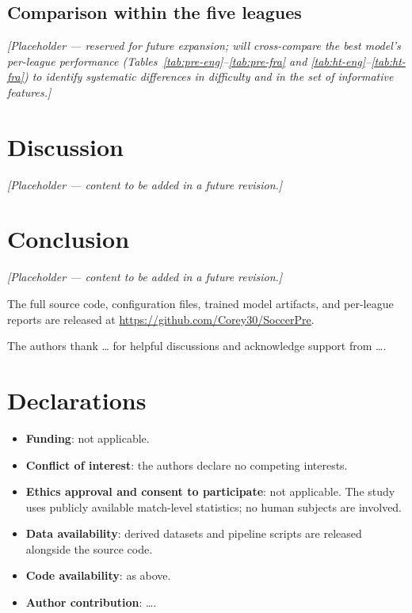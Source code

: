 \documentclass[pdflatex,sn-mathphys-num]{sn-jnl}
\theoremstyle{thmstyleone}
\theoremstyle{thmstyletwo}
\theoremstyle{thmstylethree}
\begin{document}
\subsection{Comparison within the five leagues}\label{subsec:res-cross}

\emph{[Placeholder --- reserved for future expansion; will
cross-compare the best model's per-league performance
(Tables~\ref{tab:pre-eng}--\ref{tab:pre-fra} and
\ref{tab:ht-eng}--\ref{tab:ht-fra}) to identify systematic
differences in difficulty and in the set of informative features.]}

\section{Discussion}\label{sec:discussion}
\emph{[Placeholder --- content to be added in a future revision.]}



\section{Conclusion}\label{sec:conclusion}

\emph{[Placeholder --- content to be added in a future revision.]}

\backmatter

The full source code, configuration files, trained model artifacts, and
per-league reports are released at \url{https://github.com/Corey30/SoccerPre}.

The authors thank \dots{} for helpful discussions and acknowledge
support from \dots{}.

\section*{Declarations}
\begin{itemize}
  \item \textbf{Funding}: not applicable.
  \item \textbf{Conflict of interest}: the authors declare no competing
        interests.
  \item \textbf{Ethics approval and consent to participate}: not
        applicable. The study uses publicly available match-level
        statistics; no human subjects are involved.
  \item \textbf{Data availability}: derived datasets and pipeline
        scripts are released alongside the source code.
  \item \textbf{Code availability}: as above.
  \item \textbf{Author contribution}: \dots{}.
\end{itemize}
\end{document}
